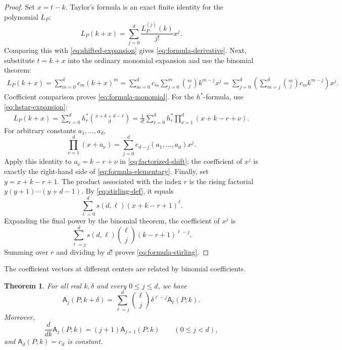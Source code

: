 \documentclass[reqno, 12pt]{article}
\numberwithin{equation}{section}
\newtheorem{theorem}{Theorem}[section]
\theoremstyle{definition}
\newcommand{\A}{\mathsf{A}}
\begin{document}
\begin{proof}
Set $x=t-k$.  Taylor's formula is an exact finite identity for the
polynomial $L_P$:
\[
  L_P(k+x)=\sum_{j=0}^{d}\frac{L_P^{(j)}(k)}{j!}x^j.
\]
Comparing this with \eqref{eq:shifted-expansion} gives \eqref{eq:formula-derivative}.
Next, substitute $t=k+x$ into the ordinary monomial expansion and use the
binomial theorem:
\begin{align*}
L_P(k+x)=\sum_{m=0}^{d}c_m(k+x)^m=\sum_{m=0}^{d}c_m\sum_{j=0}^{m}\binom{m}{j}k^{m-j}x^j
=\sum_{j=0}^{d}\left(\sum_{m=j}^{d}\binom{m}{j}c_mk^{m-j}\right)x^j.
\end{align*}
Coefficient comparison proves \eqref{eq:formula-monomial}.
For the $h^*$-formula, use \eqref{eq:hstar-expansion}:
\begin{align}\label{eq:factorized-shift}
L_P(k+x)=\sum_{r=0}^{d}h_r^*\binom{x+k+d-r}{d}=\frac1{d!}\sum_{r=0}^{d}h_r^*\prod_{\nu=1}^{d}(x+k-r+\nu).
\end{align}
For arbitrary constants $a_1,\ldots,a_d$,
\[\prod_{\nu=1}^{d}(x+a_\nu)=\sum_{j=0}^{d}e_{d-j}(a_1,\ldots,a_d)x^j.
\]
Apply this identity to $a_\nu=k-r+\nu$ in \eqref{eq:factorized-shift}; the coefficient of $x^j$ is exactly the right-hand side of \eqref{eq:formula-elementary}.
Finally, set $y=x+k-r+1$.  The product associated with the index $r$ is the rising factorial $y(y+1)\cdots(y+d-1)$. By \eqref{eq:stirling-def}, it equals
\[\sum_{\ell=0}^{d}s(d,\ell)(x+k-r+1)^\ell.
\]
Expanding the final power by the binomial theorem, the coefficient of $x^j$ is
\[\sum_{\ell=j}^{d}s(d,\ell)\binom{\ell}{j}(k-r+1)^{\ell-j}.
\]
Summing over $r$ and dividing by $d!$ proves \eqref{eq:formula-stirling}.
\end{proof}

The coefficient vectors at different centers are related by binomial coefficients.

\begin{theorem}\label{thm:translation-semigroup}
For all real $k,\delta$ and every $0\leq j\leq d$, we have
\begin{equation}\label{eq:translation-semigroup}
 \A_j(P;k+\delta)=\sum_{\ell=j}^{d}\binom{\ell}{j}\delta^{\ell-j}\A_\ell(P;k).
\end{equation}
Moreover,
\begin{equation}\label{eq:coefficient-ode}
\frac{d}{dk}\A_j(P;k)=(j+1)\A_{j+1}(P;k)\qquad(0\leq j<d),
\end{equation}
and $\A_d(P;k)=c_d$ is constant.
\end{theorem}
\end{document}
